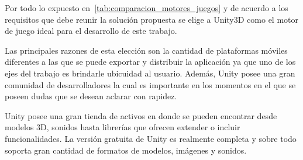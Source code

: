 \restoregeometry

Por todo lo expuesto en~\ref{tab:comparacion_motores_juegos} y de acuerdo a los
requisitos que debe reunir la solución propuesta se elige a Unity3D como el
motor de juego ideal para el desarrollo de este trabajo.

Las principales razones de esta elección son la cantidad de plataformas móviles
diferentes a las que se puede exportar y distribuir la aplicación ya que uno de
los ejes del trabajo es brindarle ubicuidad al usuario. Además, Unity posee una
gran comunidad de desarrolladores la cual es importante en los momentos en el
que se poseen dudas que se desean aclarar con rapidez.

Unity posee una gran tienda de activos en donde se pueden encontrar desde
modelos 3D, sonidos hasta librerías que ofrecen extender o incluir
funcionalidades. La versión gratuita de Unity es realmente completa y sobre todo
soporta gran cantidad de formatos de modelos, imágenes y sonidos.
